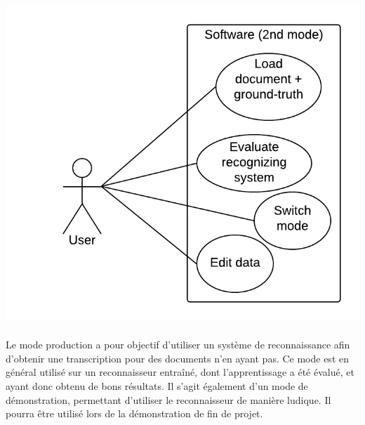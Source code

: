 \paragraph{}

\begin{mdframed}[frametitle={Figure 3 : Diagramme de cas d'utilisation (mode évaluation)}, innerbottommargin=10]
\begin{center}
\includegraphics[scale=0.6]{Usecase_2.png}
\end{center}
\end{mdframed}

\paragraph{}
Le mode production a pour objectif d’utiliser un système de reconnaissance afin
d’obtenir une transcription pour des documents n’en ayant pas. Ce mode est en
général utilisé sur un reconnaisseur entraîné, dont l’apprentissage a été
évalué, et ayant donc obtenu de bons résultats. Il s’agit également d’un mode
de démonstration, permettant d’utiliser le reconnaisseur de manière ludique.
Il pourra être utilisé lors de la démonstration de fin de projet.

